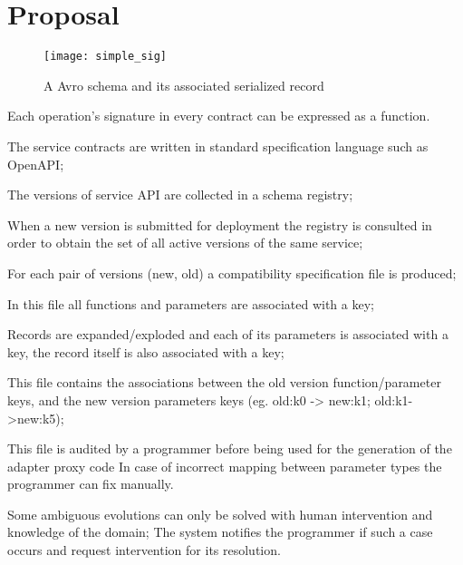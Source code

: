 
%

\chapter{Proposal}
\label{cha:proposal}


\begin{figure}[htbp]
    \centering
    \texttt{[image: simple\_sig]}
    \caption{A Avro schema and its associated serialized record }
    \label{fig:avro}
\end{figure}

Each operation's signature in every contract can be expressed as a function.



The service contracts are written in standard specification language such as OpenAPI;

The versions of service API are collected in a schema registry;

When a new version is submitted for deployment the registry is consulted in order to obtain the set of all active versions of the same service;

For each pair of versions (new, old) a compatibility specification file is produced;



In this file all functions and parameters are associated with a key;

Records are expanded/exploded and each of its parameters is associated with a key, the record itself is also associated with a key;

This file contains the associations between the old version function/parameter keys, and the new version parameters keys (eg. old:k0 -> new:k1; old:k1->new:k5);

This file is audited by a programmer before being used for the generation of the adapter proxy code
In case of incorrect mapping between parameter types the programmer can fix manually.

Some ambiguous evolutions can only be solved with human intervention and knowledge of the domain;
The system notifies the programmer if such a case occurs and request intervention for its resolution.

